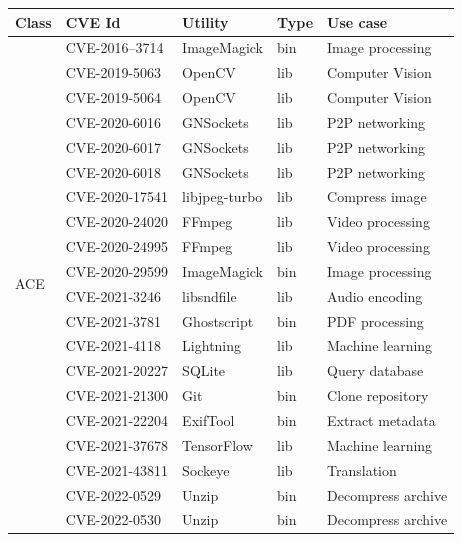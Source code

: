 \begin{table}[!t]
	\setlength{\tabcolsep}{3mm}
	\begin{tabular*}{\columnwidth}{ l l l l l}
	  \toprule
	  {\bf Class} & {\bf CVE Id} & {\bf Utility} & {\bf Type} & {\bf Use case}\\
          \midrule
	  \multirow{25}{*}{ACE}                     & CVE-2016–3714    & ImageMagick    & bin & Image processing    \\
						    & CVE-2019-5063    & OpenCV         & lib & Computer Vision     \\
						    & CVE-2019-5064    & OpenCV         & lib & Computer Vision     \\
						    & CVE-2020-6016    & GNSockets      & lib & P2P networking      \\ 
						    & CVE-2020-6017    & GNSockets      & lib & P2P networking      \\ 
						    & CVE-2020-6018    & GNSockets      & lib & P2P networking      \\
						    & CVE-2020-17541   & libjpeg-turbo  & lib & Compress image      \\
						    & CVE-2020-24020   & FFmpeg         & lib & Video processing    \\
						    & CVE-2020-24995   & FFmpeg         & lib & Video processing    \\
						    & CVE-2020-29599   & ImageMagick    & bin & Image processing    \\
						    & CVE-2021-3246    & libsndfile     & lib & Audio encoding      \\
						    & CVE-2021-3781    & Ghostscript    & bin & PDF processing      \\
							& CVE-2021-4118    & Lightning      & lib & Machine learning    \\
						    & CVE-2021-20227   & SQLite         & lib & Query database      \\
						    & CVE-2021-21300   & Git            & bin & Clone repository    \\
						    & CVE-2021-22204   & ExifTool       & bin & Extract metadata    \\
						    & CVE-2021-37678   & TensorFlow     & lib & Machine learning    \\
							& CVE-2021-43811   & Sockeye        & lib & Translation         \\
						    & CVE-2022-0529    & Unzip          & bin & Decompress archive  \\
						    & CVE-2022-0530    & Unzip          & bin & Decompress archive  \\

\end{tabular*}
\end{table}
